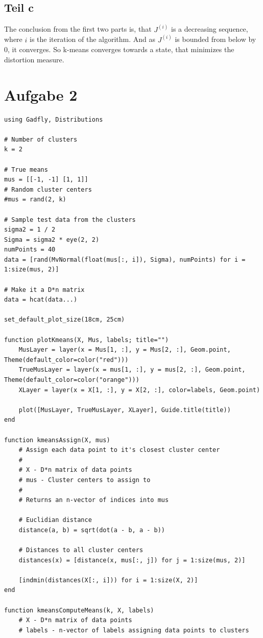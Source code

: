 \documentclass[10pt,a4paper]{article}
\begin{document}
\subsection{Teil c}

The conclusion from the first two parts is, that $J^{(i)}$ is a decreasing
sequence, where $i$ is the iteration of the algorithm. And as $J^{(i)}$ is
bounded from below by $0$, it converges. So k-means converges towards a state,
that minimizes the distortion measure.

\section{Aufgabe 2}

\begin{verbatim}
using Gadfly, Distributions

# Number of clusters
k = 2

# True means
mus = [[-1, -1] [1, 1]]
# Random cluster centers
#mus = rand(2, k)

# Sample test data from the clusters
sigma2 = 1 / 2
Sigma = sigma2 * eye(2, 2)
numPoints = 40
data = [rand(MvNormal(float(mus[:, i]), Sigma), numPoints) for i = 1:size(mus, 2)]

# Make it a D*n matrix
data = hcat(data...)

set_default_plot_size(18cm, 25cm)

function plotKmeans(X, Mus, labels; title="")
    MusLayer = layer(x = Mus[1, :], y = Mus[2, :], Geom.point, Theme(default_color=color("red")))
    TrueMusLayer = layer(x = mus[1, :], y = mus[2, :], Geom.point, Theme(default_color=color("orange")))
    XLayer = layer(x = X[1, :], y = X[2, :], color=labels, Geom.point)

    plot([MusLayer, TrueMusLayer, XLayer], Guide.title(title))
end

function kmeansAssign(X, mus)
    # Assign each data point to it's closest cluster center
    #
    # X - D*n matrix of data points
    # mus - Cluster centers to assign to
    #
    # Returns an n-vector of indices into mus

    # Euclidian distance
    distance(a, b) = sqrt(dot(a - b, a - b))

    # Distances to all cluster centers
    distances(x) = [distance(x, mus[:, j]) for j = 1:size(mus, 2)]

    [indmin(distances(X[:, i])) for i = 1:size(X, 2)]
end

function kmeansComputeMeans(k, X, labels)
    # X - D*n matrix of data points
    # labels - n-vector of labels assigning data points to clusters


\end{verbatim}
\end{document}
